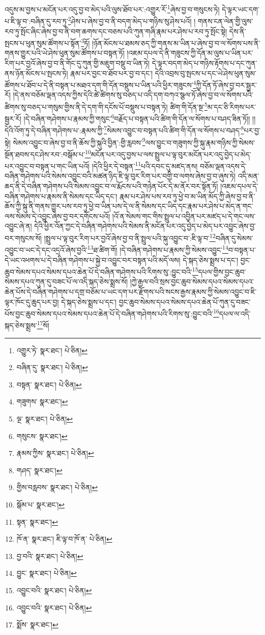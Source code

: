 འདུས་མ་བྱས་པ་མངོན་པར་འདུ་བྱ་བ་མེད་པའི་ལུས་ཐོབ་པར་:འགྱུར་རོ་\footnote{འགྱུར་ཏེ་  སྣར་ཐང་།  པེ་ཅིན། }ཞེས་བྱ་བ་གསུངས་ཏེ། དེ་ལྟར་ཡང་དག་པ་ཇི་ལྟ་བ་:བཞིན་དུ་རབ་ཏུ་\footnote{བཞིན་དུ་  སྣར་ཐང་།  པེ་ཅིན། }ཤེས་པ་ཞེས་བྱ་བ་ནི་བདག་མེད་པ་གཉིས་སུ་ཤེས་པའོ། །
གནས་ངན་ལེན་གྱི་ལུས་རབ་ཏུ་སྤོང་ཞིང་ཞེས་བྱ་བ་ནི་བག་ཆགས་དང་བཅས་པའི་ཀུན་གཞི་རྣམ་པར་ཤེས་པ་རབ་ཏུ་སྤོང་སྟེ། དེས་ནི་སྤངས་པ་ཕུན་སུམ་ཚོགས་པ་སྟོན་\footnote{བསྟན་  སྣར་ཐང་།  པེ་ཅིན། }ཏོ། །ཉོན་མོངས་པ་ཐམས་ཅད་ཀྱི་གནས་མ་ཡིན་པ་ཞེས་བྱ་བ་ལ་སོགས་པས་ནི་གནས་གྱུར་པའི་ཡེ་ཤེས་ཕུན་སུམ་ཚོགས་པ་བསྟན་ཏོ། །འཇམ་དཔལ་དེ་ནི་གཟུངས་ཀྱི་དོན་མ་ལུས་པ་ཡིན་པར་རིག་པར་བྱའོ་ཞེས་བྱ་བ་ནི་གོང་དུ་ཀུན་གྱི་མཇུག་བསྡུ་བ་ཡིན་ཏེ། དེ་ལྟར་བདག་མེད་པ་གཉིས་རྟོགས་པ་དང་ཀུན་ནས་ཉོན་མོངས་པ་སྤངས་ཏེ། རྣམ་པར་བྱང་བ་ཐོབ་པར་བྱ་བ་དང་། དེའི་འབྲས་བུ་སྤངས་པ་དང་ཡེ་ཤེས་ཕུན་སུམ་ཚོགས་པ་ཐོབ་པ་དེ་ནི་བསྟན་པ་མཐའ་དག་གི་དོན་བསྡུས་པ་ཡིན་པའི་ཕྱིར་གཟུངས་\footnote{གཟུགས་  སྣར་ཐང་། }ཀྱི་དོན་ཏོ་ཞེས་བྱ་བར་སྦྱར་རོ། །དེ་ནས་བཅོམ་ལྡན་འདས་ཀྱིས་དེའི་ཚེ་ཚིགས་སུ་བཅད་པ་འདི་དག་བཀའ་སྩལ་ཏོ་ཞེས་བྱ་བ་ལ་སོགས་པའི་ཚིགས་སུ་བཅད་པ་གསུམ་གྱིས་ནི་དེ་དག་གི་དངོས་པོ་བསྡུས་པ་བསྟན་ཏེ། ཚིག་གི་དོན་སྔ་\footnote{ལྔ་  སྣར་ཐང་།  པེ་ཅིན། }མ་དང་ཅི་རིགས་པར་སྦྱར་རོ། །དེ་བཞིན་གཤེགས་པ་རྣམས་ཀྱི་གསུང་\footnote{གསུངས་  སྣར་ཐང་། }བརྗོད་པ་བསྟན་པའི་ཚིག་གི་དོན་ལ་སོགས་པ་བཤད་ཟིན་ཏོ།། །།དེའི་འོག་ཏུ་དེ་བཞིན་གཤེགས་པ་:རྣམས་ཀྱི་\footnote{རྣམས་ཀྱིས་  སྣར་ཐང་།  པེ་ཅིན། }སེམས་འབྱུང་བ་བསྟན་པའི་ཚིག་གི་དོན་ལ་སོགས་པ་བཤད་\footnote{གཤད་  སྣར་ཐང་། }པར་བྱ་སྟེ། སེམས་འབྱུང་བ་ཞེས་བྱ་བ་ནི་ཆོས་ཀྱི་སྐུའི་བྱིན་:གྱི་རླབས་\footnote{གྱིས་བརླབས་  སྣར་ཐང་།  པེ་ཅིན། }ལས་བྱུང་བ་གཟུགས་ཀྱི་སྐུ་རྣམ་གཉིས་ཀྱི་སེམས་སྔོན་ཐབས་དང་ཤེས་རབ་:བསྒོམ་པ་\footnote{སྒོམ་པ་  སྣར་ཐང་། }མངོན་པར་འདུ་བྱས་པ་ལས་སྤྲུལ་པ་ལྟ་བུར་མངོན་པར་འདུ་བྱེད་པ་མེད་པར་འབྱུང་བ་བསྟན་པ་གང་ཡིན་པའོ། །དེའི་ཕྱིར་དེ་བསྟན་\footnote{སྟན་  སྣར་ཐང་། }པའི་དབང་དུ་མཛད་ནས། བཅོམ་ལྡན་འདས་དེ་བཞིན་གཤེགས་པའི་སེམས་འབྱུང་བའི་མཚན་ཉིད་ཇི་ལྟ་བུར་རིག་པར་བགྱི་བ་ལགས་ཞེས་བྱ་བ་ཞུས་ཏེ། འདི་མན་ཆད་ནི་དེ་བཞིན་གཤེགས་པའི་སེམས་འབྱུང་བ་ལ་རྨོངས་པའི་གཉེན་པོར་དེ་མ་ནོར་བར་སྟོན་ཏོ། །འཇམ་དཔལ་དེ་བཞིན་གཤེགས་པ་རྣམས་ནི་སེམས་དང་ཡིད་དང་། རྣམ་པར་ཤེས་པས་རབ་ཏུ་ཕྱེ་བ་མ་ཡིན་མོད་ཀྱི་ཞེས་བྱ་བ་ནི་ཆོས་ཀྱི་སྐུ་ནི་གནས་གྱུར་པས་རབ་ཏུ་ཕྱེ་བ་ཡིན་པས་དེ་ལ་ནི་སེམས་དང་ཡིད་དང་རྣམ་པར་ཤེས་པ་མེད་ན་གང་ལས་སེམས་དེ་འབྱུང་ཞེས་བྱ་བར་དགོངས་པའོ། །འོ་ན་སེམས་གང་གིས་སྤྲུལ་པ་འབྱིན་པར་མཛད་པ་དེ་གང་ལས་འབྱུང་ཞེ་ན། དེའི་ཕྱིར་འོན་ཀྱང་དེ་བཞིན་གཤེགས་པའི་སེམས་ནི་མངོན་པར་འདུ་བྱེད་པ་མེད་པར་འབྱུང་ཞེས་བྱ་བར་གསུངས་སོ། །སྤྲུལ་པ་ལྟ་བུར་རིག་པར་བྱའོ་ཞེས་བྱ་བ་ནི་སྤྲུལ་པའི་སྐུ་འབྱུང་བ་:ཇི་ལྟ་བ་\footnote{ཁོ་ན་  སྣར་ཐང་། ཇི་ལྟ་བ་ཁོ་ན་  པེ་ཅིན། }བཞིན་དུ་སེམས་འབྱུང་བ་ཡང་དེ་དང་འདྲའོ་ཞེས་བྱའི་\footnote{བྱ་བའི་  སྣར་ཐང་།  པེ་ཅིན། }ཐ་ཚིག་གོ། །དེ་བཞིན་གཤེགས་པ་རྣམས་ཀྱི་སེམས་འབྱུང་\footnote{བྱུང་  སྣར་ཐང་།  པེ་ཅིན། }བ་བསྟན་པ་དེ་ཡང་འཕགས་པ་དེ་བཞིན་གཤེགས་པ་སྐྱེ་བ་འབྱུང་བར་བསྟན་པའི་མདོ་ལས། དེ་སྐད་ཅེས་སྨྲས་པ་དང་། བྱང་ཆུབ་སེམས་དཔའ་སེམས་དཔའ་ཆེན་པོ་དེ་བཞིན་གཤེགས་པའི་རིགས་སུ་:བྱུང་བའི་\footnote{འབྱུང་བའི་  སྣར་ཐང་།  པེ་ཅིན། }དཔལ་གྱིས་བྱང་ཆུབ་སེམས་དཔའ་ཀུན་དུ་བཟང་པོ་ལ་འདི་སྐད་ཅེས་སྨྲས་སོ། །ཀྱེ་རྒྱལ་བའི་སྲས་བྱང་ཆུབ་སེམས་དཔའ་སེམས་དཔའ་ཆེན་པོས་དེ་བཞིན་གཤེགས་པ་དགྲ་བཅོམ་པ་ཡང་དག་པར་རྫོགས་པའི་སངས་རྒྱས་རྣམས་ཀྱི་སེམས་འབྱུང་བ་ཇི་ལྟར་ཁོང་དུ་ཆུད་པར་བྱ། དེ་སྐད་ཅེས་སྨྲས་པ་དང་། བྱང་ཆུབ་སེམས་དཔའ་སེམས་དཔའ་ཆེན་པོ་ཀུན་དུ་བཟང་པོས་བྱང་ཆུབ་སེམས་དཔའ་སེམས་དཔའ་ཆེན་པོ་དེ་བཞིན་གཤེགས་པའི་རིགས་སུ་:བྱུང་བའི་\footnote{འབྱུང་བའི་  སྣར་ཐང་།  པེ་ཅིན། }དཔལ་ལ་འདི་སྐད་ཅེས་སྨྲས་\footnote{སྨོས་  སྣར་ཐང་། }སོ། 